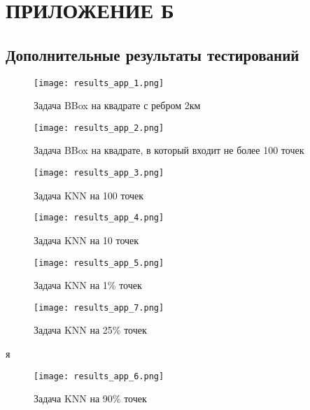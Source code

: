 \chapter{ПРИЛОЖЕНИЕ Б}
\section{Дополнительные результаты тестирований}

\begin{figure}[h]
    \centering
    \texttt{[image: results\_app\_1.png]}
    \caption{Задача BBox на квадрате с ребром 2км}
\end{figure}

\begin{figure}[h]
    \centering
    \texttt{[image: results\_app\_2.png]}
    \caption{Задача BBox на квадрате, в который входит не более 100 точек}
\end{figure}

\begin{figure}[h]
    \centering
    \texttt{[image: results\_app\_3.png]}
    \caption{Задача KNN на 100 точек}
\end{figure}

\begin{figure}[h]
    \centering
    \texttt{[image: results\_app\_4.png]}
    \caption{Задача KNN на 10 точек}
\end{figure}

\begin{figure}[h]
    \centering
    \texttt{[image: results\_app\_5.png]}
    \caption{Задача KNN на 1\% точек}
\end{figure}

\begin{figure}[h]
    \centering
    \texttt{[image: results\_app\_7.png]}
    \caption{Задача KNN на 25\% точек}
\end{figure}
я
\begin{figure}[h]
    \centering
    \texttt{[image: results\_app\_6.png]}
    \caption{Задача KNN на 90\% точек}
\end{figure}


